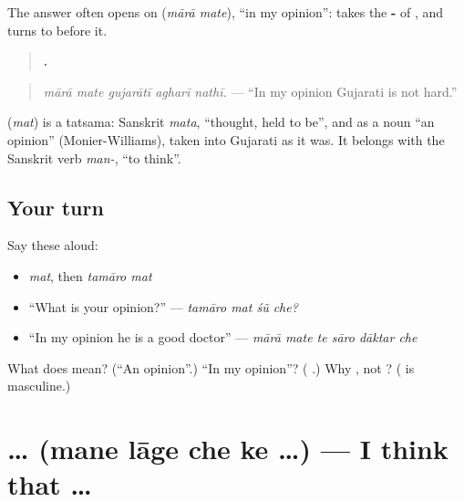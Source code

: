 The answer often opens on \textbf{ } (\emph{mārā mate}), \textquotedblleft{}in my opinion\textquotedblright{}: \textbf{} takes the \textbf{-} of \textbf{}, and \textbf{} turns to \textbf{} before it.

\begin{quote}
\textbf{    .}
\end{quote}

\begin{quote}
\emph{mārā mate gujarātī agharī nathī.} — \textquotedblleft{}In my opinion Gujarati is not hard.\textquotedblright{}
\end{quote}

\begin{cousinweb}
\textbf{} (\emph{mat}) is a tatsama: Sanskrit \emph{mata}, \textquotedblleft{}thought, held to be\textquotedblright{}, and as a noun \textquotedblleft{}an opinion\textquotedblright{} (Monier-Williams), taken into Gujarati as it was. It belongs with the Sanskrit verb \emph{man-}, \textquotedblleft{}to think\textquotedblright{}.
\end{cousinweb}

\subsection*{Your turn}
Say these aloud:

\begin{itemize}
\raggedright
  \item \emph{mat}, then \emph{tamāro mat}
  \item \textquotedblleft{}What is your opinion?\textquotedblright{} — \emph{tamāro mat śũ che?}
  \item \textquotedblleft{}In my opinion he is a good doctor\textquotedblright{} — \emph{mārā mate te sāro dāktar che}
\end{itemize}

\begin{tcolorbox}[breakable,colback=teal!4,colframe=teal!35!black,title={Before you move on}]
What does \textbf{} mean? (\textquotedblleft{}An opinion\textquotedblright{}.) \textquotedblleft{}In my opinion\textquotedblright{}? (\textbf{ }.) Why \textbf{}, not \textbf{}? (\textbf{} is masculine.)
\end{tcolorbox}
\section[\texorpdfstring{\gu{મને} \gu{લાગે} \gu{છે} \gu{કે} … (mane lāge che ke …)}{મને લાગે છે કે … (mane lāge che ke …)}]{    … (mane lāge che ke …) — I think that …}

